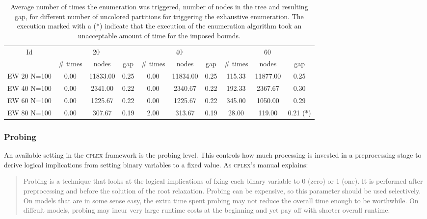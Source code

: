 \begin{sidewaystable}[h]
\centering

\begin{tabular}{|c|ccc|ccc|ccc|}
\hline
\multicolumn{1}{|c|}{Id} & \multicolumn{3}{|c|}{20} & \multicolumn{3}{|c|}{40} & \multicolumn{3}{|c|}{60}
\\
 & \# times & nodes & gap & \# times & nodes & gap & \# times & nodes & gap
\\
\hline
EW 20 N=100 & 0.00 & 11833.00 & 0.25 & 0.00 & 11834.00 & 0.25 & 115.33 & 11877.00 & 0.25
\\
EW 40 N=100 & 0.00 & 2341.00 & 0.22 & 0.00 & 2340.67 & 0.22 & 192.33 & 2367.67 & 0.30
\\
EW 60 N=100 & 0.00 & 1225.67 & 0.22 & 0.00 & 1225.67 & 0.22 & 345.00 & 1050.00 & 0.29
\\
EW 80 N=100 & 0.00 & 307.67 & 0.19 & 2.00 & 313.67 & 0.19 & 28.00 & 119.00 & 0.21 (*)
\\
\hline 
 \end{tabular}

\caption{Average number of times the enumeration was triggered, number of nodes in the tree and resulting gap, for different number of uncolored partitions for triggering the exhaustive enumeration. The execution marked with a (*) indicate that the execution of the enumeration algorithm took an unacceptable amount of time for the imposed bounds.}
\label{table:bnc:prune}

\end{sidewaystable}

\subsubsection{Probing}

An available setting in the \textsc{cplex} framework is the probing level. This controls how much processing is invested in a preprocessing stage to derive logical implications from setting binary variables to a fixed value. As \textsc{cplex}'s manual \cite{cplex121} explains:

\begin{quote}

Probing is a technique that looks at the logical implications of fxing each binary variable to 0 (zero) or 1 (one). It is performed after preprocessing and before the solution of the root relaxation. Probing can be expensive, so this parameter should be used selectively. On models that are in some sense easy, the extra time spent probing may not reduce the overall time enough to be worthwhile. On diffcult models, probing may incur very large runtime costs at the beginning and yet pay off with shorter overall runtime. 

\end{quote}

